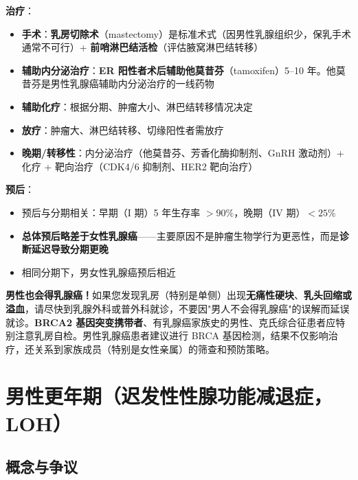 \begin{enumerate}
\vspace{0.5em}
\noindent\textbf{治疗}：

\begin{itemize}[leftmargin=2cm]
	\item \textbf{手术}：\textbf{乳房切除术}（mastectomy）是标准术式（因男性乳腺组织少，保乳手术通常不可行）+ \textbf{前哨淋巴结活检}（评估腋窝淋巴结转移）
	\item \textbf{辅助内分泌治疗}：\textbf{ER 阳性者术后辅助他莫昔芬}（tamoxifen）5--10 年。他莫昔芬是男性乳腺癌辅助内分泌治疗的一线药物
	\item \textbf{辅助化疗}：根据分期、肿瘤大小、淋巴结转移情况决定
	\item \textbf{放疗}：肿瘤大、淋巴结转移、切缘阳性者需放疗
	\item \textbf{晚期/转移性}：内分泌治疗（他莫昔芬、芳香化酶抑制剂、GnRH 激动剂）+ 化疗 + 靶向治疗（CDK4/6 抑制剂、HER2 靶向治疗）
\end{itemize}

\vspace{0.5em}
\noindent\textbf{预后}：

\begin{itemize}[leftmargin=2cm]
	\item 预后与分期相关：早期（I 期）5 年生存率 $>90\%$，晚期（IV 期）$<25\%$
	\item \textbf{总体预后略差于女性乳腺癌}——主要原因不是肿瘤生物学行为更恶性，而是\textbf{诊断延迟导致分期更晚}
	\item 相同分期下，男女性乳腺癌预后相近
\end{itemize}

\begin{tcolorbox}[colback=pink!5!white,colframe=red!50!black,title=贴心小叮咛]
\textbf{男性也会得乳腺癌！}如果您发现乳房（特别是单侧）出现\textbf{无痛性硬块}、\textbf{乳头回缩或溢血}，请尽快到乳腺外科或普外科就诊，不要因"男人不会得乳腺癌"的误解而延误就诊。\textbf{BRCA2 基因突变携带者}、有乳腺癌家族史的男性、克氏综合征患者应特别注意乳房自检。男性乳腺癌患者建议进行 BRCA 基因检测，结果不仅影响治疗，还关系到家族成员（特别是女性亲属）的筛查和预防策略。
\end{tcolorbox}

\section{男性更年期（迟发性性腺功能减退症，LOH）}
\label{sec:male_menopause}

\subsection{概念与争议}


\end{enumerate}
